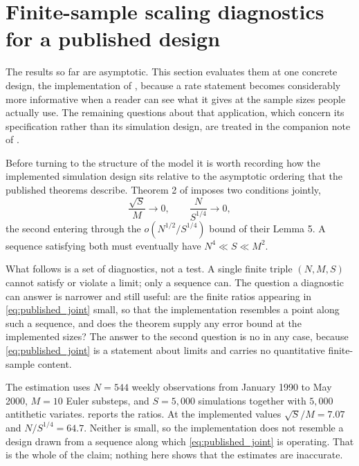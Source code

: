 \documentclass[11pt]{article}
\theoremstyle{definition}
\begin{document}
\FloatBarrier
\section{Finite-sample scaling diagnostics for a published design}\label{sec:design}

The results so far are asymptotic. This section evaluates them at one concrete design, the implementation of \citet{BrandtSantaClara2002}, because a rate statement becomes considerably more informative when a reader can see what it gives at the sample sizes people actually use. The remaining questions about that application, which concern its specification rather than its simulation design, are treated in the companion note of .

Before turning to the structure of the model it is worth recording how the implemented simulation design sits relative to the asymptotic ordering that the published theorems describe. Theorem 2 of \citet{BrandtSantaClara2002} imposes two conditions jointly,
\begin{equation}\label{eq:published_joint}
\frac{\sqrt S}{M}\longrightarrow0,
\qquad
\frac{N}{S^{1/4}}\longrightarrow0,
\end{equation}
the second entering through the $o(N^{1/2}/S^{1/4})$ bound of their Lemma 5. A sequence satisfying both must eventually have $N^4\ll S\ll M^2$.

What follows is a set of diagnostics, not a test. A single finite triple $(N,M,S)$ cannot satisfy or violate a limit; only a sequence can. The question a diagnostic can answer is narrower and still useful: are the finite ratios appearing in \eqref{eq:published_joint} small, so that the implementation resembles a point along such a sequence, and does the theorem supply any error bound at the implemented sizes? The answer to the second question is no in any case, because \eqref{eq:published_joint} is a statement about limits and carries no quantitative finite-sample content.

The estimation uses $N=544$ weekly observations from January 1990 to May 2000, $M=10$ Euler substeps, and $S=5{,}000$ simulations together with $5{,}000$ antithetic variates.  reports the ratios. At the implemented values $\sqrt S/M=7.07$ and $N/S^{1/4}=64.7$. Neither is small, so the implementation does not resemble a design drawn from a sequence along which \eqref{eq:published_joint} is operating. That is the whole of the claim; nothing here shows that the estimates are inaccurate.
\end{document}
